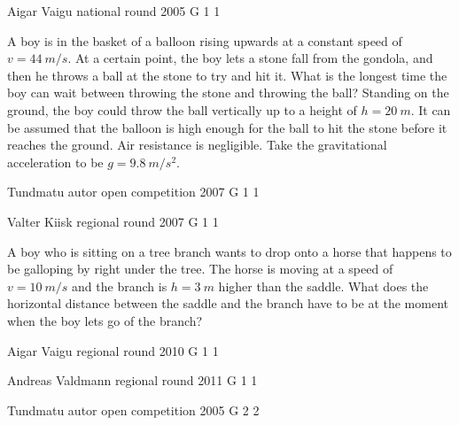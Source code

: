 \documentclass[11pt]{article}
\begin{document}
\graphicspath{{../problems/}}

{Aigar Vaigu} %
{national round} %
{2005} %
{G 1} %
{1} %
{

\ifEngStatement
A boy is in the basket of a balloon rising upwards at a constant speed of $v=4\SI{4}{m/s}$. At a certain point, the boy lets a stone fall from the gondola, and then he throws a ball at the stone to try and hit it. What is the longest time the boy can wait between throwing the stone and throwing the ball? Standing on the ground, the boy could throw the ball vertically up to a height of $h = \SI{20}{m}$. It can be assumed that the balloon is high enough for the ball to hit the stone before it reaches the ground. Air resistance is negligible. Take the gravitational acceleration to be $g=\SI{9.8}{m/s^2}$.  
\fi
}

\ylDisplay{} %
{Tundmatu autor} %
{open competition} %
{2007} %
{G 1} %
{1} %
{

\ifEngStatement
\fi
}

{Valter Kiisk} %
{regional round} %
{2007} %
{G 1} %
{1} %
{

\ifEngStatement
A boy who is sitting on a tree branch wants to drop onto a horse that happens to be galloping by right under the tree. The horse is moving at a speed of $v = \SI{10}{m/s}$ and the branch is $h = \SI{3}{m}$ higher than the saddle. What does the horizontal distance between the saddle and the branch have to be at the moment when the boy lets go of the branch?
\fi
}

\ylDisplay{} %
{Aigar Vaigu} %
{regional round} %
{2010} %
{G 1} %
{1} %
{

\ifEngStatement
\fi
}

\ylDisplay{} %
{Andreas Valdmann} %
{regional round} %
{2011} %
{G 1} %
{1} %
{

\ifEngStatement
\fi
}

\ylDisplay{} %
{Tundmatu autor} %
{open competition} %
{2005} %
{G 2} %
{2} %
{

\ifEngStatement
\fi
}
\end{document}
